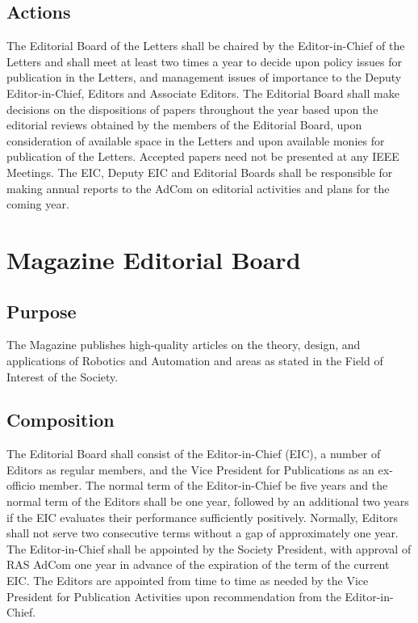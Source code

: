 \documentclass[10pt]{article}
\begin{document}
\subsection{Actions}

The Editorial Board of the Letters shall be chaired by the Editor-in-Chief of the Letters and shall meet at least two times a year to decide upon policy issues for publication in the Letters, and management issues of importance to the Deputy Editor-in-Chief, Editors and Associate Editors.  The Editorial Board shall make decisions on the dispositions of papers throughout the year based upon the editorial reviews obtained by the members of the Editorial Board, upon consideration of available space in the Letters and upon available monies for publication of the Letters.  Accepted papers need not be presented at any IEEE Meetings. The EIC, Deputy EIC and Editorial Boards shall be responsible for making annual reports to the AdCom on editorial activities and plans for the coming year.


\section{Magazine Editorial Board}
\subsection{Purpose}

The Magazine publishes high-quality articles on the theory, design, and applications of Robotics and Automation and areas as stated in the Field of Interest of the Society.


\subsection{Composition}
\label{MEB:Composition}
The Editorial Board shall consist of the Editor-in-Chief (EIC), a number of Editors as regular members, and the Vice President for Publications as an ex-officio member.  The normal term of the Editor-in-Chief be five years and the normal term of the Editors shall be one year, followed by an additional two years if the EIC evaluates their performance sufficiently positively. Normally, Editors shall not serve two consecutive terms without a gap of approximately one year.  The Editor-in-Chief shall be appointed by the Society President, with approval of RAS AdCom one year in advance of the expiration of the term of the current EIC.  The Editors are appointed from time to time as needed by the Vice President for Publication Activities upon recommendation from the Editor-in-Chief.
\end{document}
